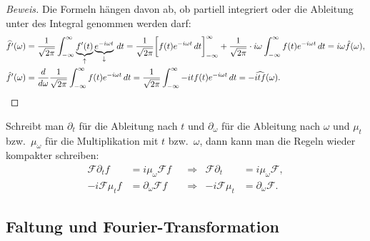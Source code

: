 \begin{proof}[Beweis]
Die Formeln hängen davon ab, ob partiell integriert oder die Ableitung
unter des Integral genommen werden darf:
\begin{align*}
\widehat{f'}(\omega)
&=
\frac{1}{\sqrt{2\pi}}
\int_{-\infty}^\infty \underbrace{f'(t)}_{\uparrow}\underbrace{e^{-i\omega t}}_{\downarrow}\,dt
=
\frac{1}{\sqrt{2\pi}}
\biggl[
f(t)e^{-i\omega t}\,dt
\biggr]_{-\infty}^\infty
+
\frac{1}{\sqrt{2\pi}}
\cdot
i\omega
\int_{-\infty}^\infty f(t)e^{-i\omega t}\,dt
=
i\omega\hat{f}(\omega),
\\
\hat{f}'(\omega)
&=
\frac{d}{d\omega}
\frac{1}{\sqrt{2\pi}} \int_{-\infty}^\infty
f(t) e^{-i\omega t}\,dt
=
\frac{1}{\sqrt{2\pi}} \int_{-\infty}^\infty
-it f(t) e^{-i\omega t}\,dt
=
-\widehat{itf}(\omega).
\qedhere
\end{align*}
\end{proof}

Schreibt man $\partial_t$ für die Ableitung nach $t$ und $\partial_\omega$
für die Ableitung nach $\omega$ und $\mu_{t}$ bzw.~$\mu_{\omega}$ für
die Multiplikation mit $t$ bzw.~$\omega$, dann kann man die Regeln wieder
kompakter schreiben:
\[
\begin{aligned}
\mathcal{F}\partial_t f &= i\mu_{\omega}\mathcal{F}f
&&\Rightarrow&
\mathcal{F}\partial_t &= i\mu_{\omega}\mathcal{F},
\\
-i\mathcal{F}\mu_t f &= \partial_\omega\mathcal{F} f
&&\Rightarrow&
-i\mathcal{F}\mu_t &= \partial_\omega\mathcal{F}.
\end{aligned}
\]

\subsection{Faltung und Fourier-Transformation
\label{subsection:faltung-und-ft}}

